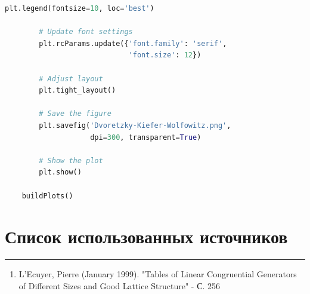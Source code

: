 \documentclass[a4paper, 14pt]{extarticle}
\begin{document}
\begin{center}
\begin{lstlisting}[language=Python]
        plt.legend(fontsize=10, loc='best')

        # Update font settings
        plt.rcParams.update({'font.family': 'serif', 
                             'font.size': 12})

        # Adjust layout
        plt.tight_layout()

        # Save the figure
        plt.savefig('Dvoretzky-Kiefer-Wolfowitz.png', 
                    dpi=300, transparent=True)

        # Show the plot
        plt.show()

    buildPlots()
  \end{lstlisting}
\end{center}


\vfill

\section{Список использованных источников}\vspace{-20pt}\rule{\linewidth}{0.1mm}
\begin{enumerate}
  \item \label{item:source1} L'Ecuyer, Pierre (January 1999). "Tables of Linear Congruential Generators of Different Sizes and Good Lattice Structure" - С. 256
\end{enumerate}
\end{document}

